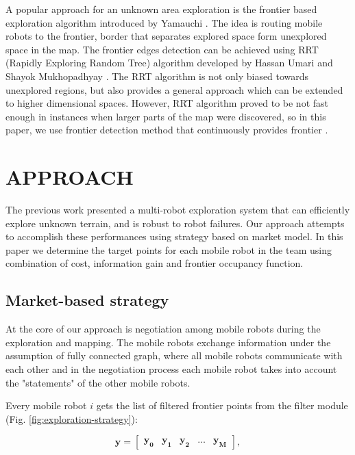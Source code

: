 \documentclass[letterpaper, 10 pt, conference]{ieeeconf}  %
\begin{document}
A popular approach for an unknown area exploration is the frontier based exploration algorithm introduced by Yamauchi \cite{Yamauchi}. The idea is routing mobile robots to the frontier, border that separates explored space form unexplored space in the map. The frontier edges detection can be achieved using RRT (Rapidly Exploring Random Tree) algorithm developed by Hassan Umari and Shayok Mukhopadhyay \cite{Umari}. The RRT algorithm is not only biased towards unexplored regions, but also provides a general approach which can be extended to higher dimensional spaces. However, RRT algorithm proved to be not fast enough in instances when larger parts of the map were discovered, so in this paper, we use frontier detection method that continuously provides frontier \cite{juraj}.   

\section{APPROACH}

The previous work presented a multi-robot exploration system that can efficiently explore unknown terrain, and is robust to robot failures. Our approach attempts to accomplish these performances using strategy based on market model. 
In this paper we determine the target points for each mobile robot in the team using combination of cost, information gain  and frontier occupancy function. 

\subsection{Market-based strategy} 

At the core of our approach is negotiation among mobile robots during the exploration and mapping. The mobile robots exchange information under the assumption of fully connected graph, where all mobile robots communicate with each other and in the negotiation process each mobile robot takes into account the "statements" of the other mobile robots.

Every mobile robot $i$ gets the list of filtered frontier points from the filter module (Fig. \ref{fig:exploration-strategy}):

\begin{equation}
   \boldsymbol{y}=\begin{bmatrix}
    \boldsymbol{y_{0}} & \boldsymbol{y_{1}} & \boldsymbol{y_{2}} & \hdots & \boldsymbol{y_{M}}
\end{bmatrix},
\end{equation}
\end{document}
